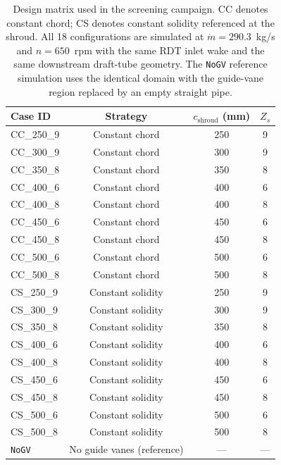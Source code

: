 \begin{table}[h!]
  \centering
  \caption[Design matrix used in the screening campaign]%
  {Design matrix used in the screening campaign. CC denotes constant chord; CS denotes constant solidity referenced at the shroud. All 18 configurations are simulated at $\dot m = 290.3$~kg/s and $n = 650$~rpm with the same RDT inlet wake and the same downstream draft-tube geometry. The \texttt{NoGV} reference simulation uses the identical domain with the guide-vane region replaced by an empty straight pipe.}
  \label{tab:design_matrix}
  \small
  \begin{tabular}{l|c|c|c}
    \toprule
    \textbf{Case ID} & \textbf{Strategy} & $c_{\mathrm{shroud}}$ (mm) & $Z_s$ \\
    \midrule
    CC\_250\_9  & Constant chord    & 250 & 9 \\
    CC\_300\_9  & Constant chord    & 300 & 9 \\
    CC\_350\_8  & Constant chord    & 350 & 8 \\
    CC\_400\_6  & Constant chord    & 400 & 6 \\
    CC\_400\_8  & Constant chord    & 400 & 8 \\
    CC\_450\_6  & Constant chord    & 450 & 6 \\
    CC\_450\_8  & Constant chord    & 450 & 8 \\
    CC\_500\_6  & Constant chord    & 500 & 6 \\
    CC\_500\_8  & Constant chord    & 500 & 8 \\
    \midrule
    CS\_250\_9  & Constant solidity & 250 & 9 \\
    CS\_300\_9  & Constant solidity & 300 & 9 \\
    CS\_350\_8  & Constant solidity & 350 & 8 \\
    CS\_400\_6  & Constant solidity & 400 & 6 \\
    CS\_400\_8  & Constant solidity & 400 & 8 \\
    CS\_450\_6  & Constant solidity & 450 & 6 \\
    CS\_450\_8  & Constant solidity & 450 & 8 \\
    CS\_500\_6  & Constant solidity & 500 & 6 \\
    CS\_500\_8  & Constant solidity & 500 & 8 \\
    \midrule
    \texttt{NoGV} & No guide vanes (reference) & --- & --- \\
    \bottomrule
  \end{tabular}
\end{table}
 
